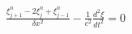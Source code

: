 \documentclass[preview]{standalone}
\begin{document}
\begin{align*}
\frac{\xi_{j+1}^{n} - 2 \xi_{j}^{n} + \xi_{j-1}^{n}}{\delta x^2} - \frac{1}{c^2}\frac{d^2 \xi}{dt^2}  = 0
\end{align*}
\end{document}
